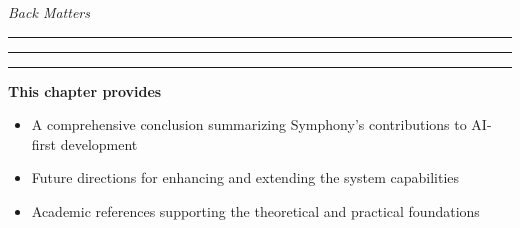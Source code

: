 
\vspace{1.5cm}

\begin{center}
\end{center}

\vspace{0.8cm}

\begin{center}
{\fontsize{28}{32}\selectfont\textcolor{brandSecondary}{\textit{Back Matters}}}
\end{center}

\vspace{0.4cm}

\begin{center}
\textcolor{brandAccent}{
\rule{2cm}{0.8pt} \quad
\raisebox{-0.2ex}{\Large$\bullet$} \quad
\rule{4cm}{0.8pt} \quad
\raisebox{-0.2ex}{\Large$\bullet$} \quad
\rule{2cm}{0.8pt}
}
\end{center}

\vspace{1.2cm}

\begin{tcolorbox}[
    enhanced,
    colback=white,
    colframe=brandPrimary!40,
    boxrule=1pt,
    arc=12pt,
    drop shadow={brandPrimary!20},
    left=1.5cm,
    right=1.5cm,
    top=1.2cm,
    bottom=1.2cm,
    before upper={\parindent0pt}
]
\begin{center}
{\Large\textbf{\textcolor{brandPrimary}{This chapter provides}}}
\end{center}

\vspace{0.8cm}

\begin{itemize}[leftmargin=1.2cm, itemsep=0.4cm, label={\textcolor{brandAccent}{$\triangleright$}}]
    \item {\large A comprehensive conclusion summarizing Symphony's contributions to AI-first development}
    \item {\large Future directions for enhancing and extending the system capabilities}
    \item {\large Academic references supporting the theoretical and practical foundations}
\end{itemize}
\end{tcolorbox}

\clearpage

